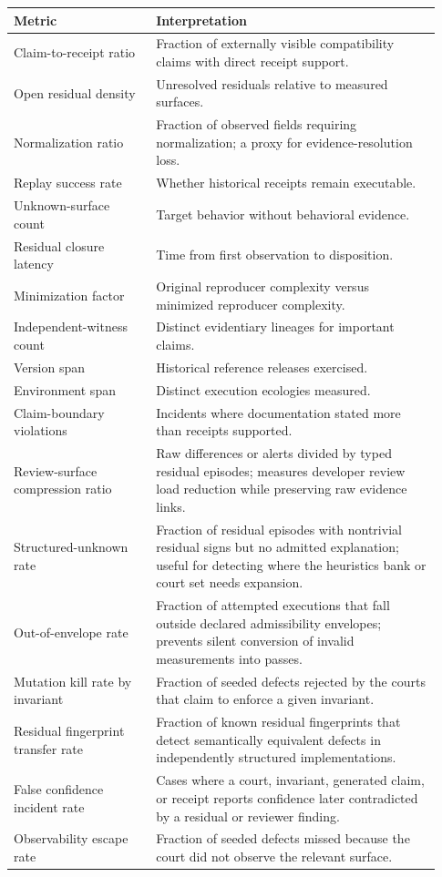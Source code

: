 \documentclass[11pt,a4paper]{article}
\begin{document}
\begin{longtable}{>{\raggedright\arraybackslash}p{0.31\linewidth}>{\raggedright\arraybackslash}p{0.62\linewidth}}
\toprule
\textbf{Metric} & \textbf{Interpretation} \\
\midrule
\endhead
Claim-to-receipt ratio & Fraction of externally visible compatibility claims with direct receipt support. \\
Open residual density & Unresolved residuals relative to measured surfaces. \\
Normalization ratio & Fraction of observed fields requiring normalization; a proxy for evidence-resolution loss. \\
Replay success rate & Whether historical receipts remain executable. \\
Unknown-surface count & Target behavior without behavioral evidence. \\
Residual closure latency & Time from first observation to disposition. \\
Minimization factor & Original reproducer complexity versus minimized reproducer complexity. \\
Independent-witness count & Distinct evidentiary lineages for important claims. \\
Version span & Historical reference releases exercised. \\
Environment span & Distinct execution ecologies measured. \\
Claim-boundary violations & Incidents where documentation stated more than receipts supported. \\
Review-surface compression ratio & Raw differences or alerts divided by typed residual episodes; measures developer review load reduction while preserving raw evidence links. \\
Structured-unknown rate & Fraction of residual episodes with nontrivial residual signs but no admitted explanation; useful for detecting where the heuristics bank or court set needs expansion. \\
Out-of-envelope rate & Fraction of attempted executions that fall outside declared admissibility envelopes; prevents silent conversion of invalid measurements into passes. \\
Mutation kill rate by invariant & Fraction of seeded defects rejected by the courts that claim to enforce a given invariant. \\
Residual fingerprint transfer rate & Fraction of known residual fingerprints that detect semantically equivalent defects in independently structured implementations. \\
False confidence incident rate & Cases where a court, invariant, generated claim, or receipt reports confidence later contradicted by a residual or reviewer finding. \\
Observability escape rate & Fraction of seeded defects missed because the court did not observe the relevant surface. \\
\bottomrule
\end{longtable}
\end{document}
